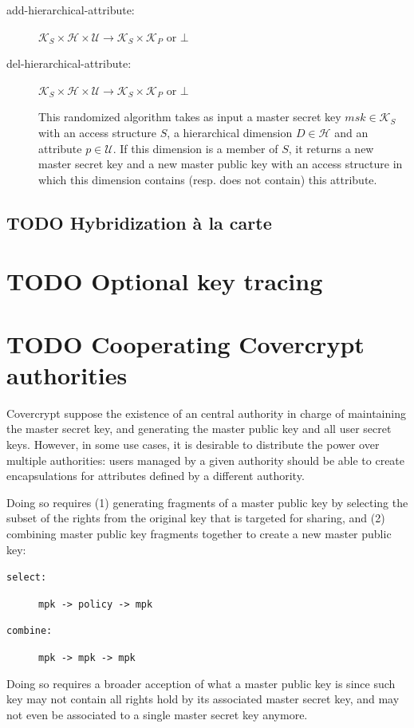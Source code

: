 \documentclass[a4paper]{article}
\theoremstyle{definition}
\newcommand{\cH}{\mathcal{H}}
\newcommand{\cK}{\mathcal{K}}
\newcommand{\cU}{\mathcal{U}}
\begin{document}
\begin{description}
\item[{add-hierarchical-attribute:}] \(\cK_S \times \cH \times \cU \rightarrow \cK_S
  \times \cK_P\) or \(\bot\)
\item[{del-hierarchical-attribute:}] \(\cK_S \times \cH \times \cU \rightarrow \cK_S
  \times \cK_P\) or \(\bot\)

This randomized algorithm  takes as input a master secret  key \(msk \in \cK_S\)
with an  access structure  \(S\), a  hierarchical dimension \(D  \in \cH\)  and an
attribute \(p \in \cU\). If this dimension is  a member of \(S\), it returns a new
master secret  key and  a new master  public key with  an access  structure in
which this dimension contains (resp. does not contain) this attribute.
\end{description}
\subsection{{\bfseries\sffamily TODO} Hybridization à la carte}
\label{sec:orgba73d5b}
\section{{\bfseries\sffamily TODO} Optional key tracing}
\label{sec:orgfb3bfd1}
\section{{\bfseries\sffamily TODO} Cooperating Covercrypt authorities}
\label{sec:org72bef40}

Covercrypt  suppose  the  existence  of   an  central  authority  in  charge  of
maintaining the master secret key, and  generating the master public key and all
user secret keys. However, in some use  cases, it is desirable to distribute the
power over  multiple authorities: users managed  by a given authority  should be
able to create encapsulations for attributes defined by a different authority.

Doing so requires  (1) generating fragments of a master  public key by selecting
the subset of the rights from the original key that is targeted for sharing, and
(2) combining master public key fragments together to create a new master public
key:
\begin{description}
\item[{\texttt{select:}}] \texttt{mpk -> policy -> mpk}
\item[{\texttt{combine:}}] \texttt{mpk -> mpk -> mpk}
\end{description}
Doing so requires a broader acception of  what a master public key is since such
key may not contain all rights hold by its associated master secret key, and may
not even be associated to a single master secret key anymore.

\newpage
\appendix
\end{document}
